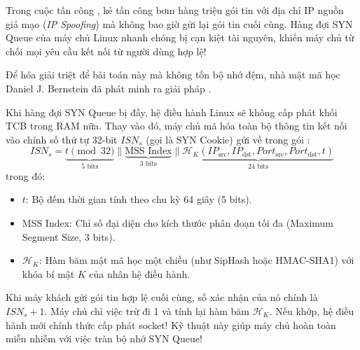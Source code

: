 Trong cuộc tấn công , kẻ tấn công bơm hàng triệu gói tin  với địa chỉ IP nguồn giả mạo (\textit{IP Spoofing}) mà không bao giờ gửi lại gói tin  cuối cùng. Hàng đợi SYN Queue của máy chủ Linux nhanh chóng bị cạn kiệt tài nguyên, khiến máy chủ từ chối mọi yêu cầu kết nối từ người dùng hợp lệ!

Để hóa giải triệt để bài toán này mà không tốn bộ nhớ đệm, nhà mật mã học Daniel J. Bernstein đã phát minh ra giải pháp .

\begin{theorem}
Khi hàng đợi SYN Queue bị đầy, hệ điều hành Linux sẽ không cấp phát khối TCB trong RAM nữa. Thay vào đó, máy chủ mã hóa toàn bộ thông tin kết nối vào chính số thứ tự 32-bit $ISN_s$ (gọi là SYN Cookie) gửi về trong gói :
\begin{equation}
ISN_s = \underbrace{t \pmod{32}}_{5 \text{ bits}} \parallel \underbrace{\text{MSS Index}}_{3 \text{ bits}} \parallel \underbrace{\mathcal{H}_K(IP_{\text{src}}, IP_{\text{dst}}, Port_{\text{src}}, Port_{\text{dst}}, t)}_{24 \text{ bits}}
\end{equation}
trong đó:
\begin{itemize}
  \item $t$: Bộ đếm thời gian tính theo chu kỳ 64 giây (5 bits).
  \item MSS Index: Chỉ số đại diện cho kích thước phân đoạn tối đa (Maximum Segment Size, 3 bits).
  \item $\mathcal{H}_K$: Hàm băm mật mã học một chiều (như SipHash hoặc HMAC-SHA1) với khóa bí mật $K$ của nhân hệ điều hành.
\end{itemize}
Khi máy khách gửi gói tin  hợp lệ cuối cùng, số xác nhận của nó chính là $ISN_s + 1$. Máy chủ chỉ việc trừ đi 1 và tính lại hàm băm $\mathcal{H}_K$. Nếu khớp, hệ điều hành mới chính thức cấp phát socket! Kỹ thuật này giúp máy chủ hoàn toàn miễn nhiễm với việc tràn bộ nhớ SYN Queue!
\end{theorem}

